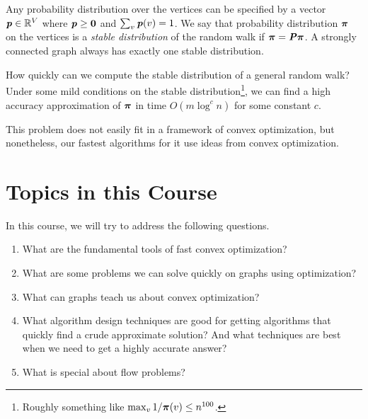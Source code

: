 Any probability distribution over the vertices can be specified by a vector
$\boldsymbol{\mathit{p}} \in \mathbb{R}^V$ where $\boldsymbol{\mathit{p}} \geq
\boldsymbol{0}$ and $\sum_v \boldsymbol{\mathit{p}}(v) = 1$.
We say that probability distribution $\boldsymbol{\pi}$ on the vertices is a \emph{stable distribution} of the random walk
if $\boldsymbol{\pi} = \boldsymbol{\mathit{P}} \boldsymbol{\pi}$.
A strongly connected graph always has exactly one stable distribution.

How quickly can we compute the stable distribution of a general random
walk? Under some mild conditions on the stable
distribution\footnote{Roughly something like $\max_{v} 1/\boldsymbol{\pi}(v) \leq n^{100}$.}, we can find
a high accuracy approximation of $\boldsymbol{\pi}$ in time $O(m \log^cn )$ for
some constant $c$.

This problem does not easily fit in a framework of convex
optimization, but nonetheless, our fastest algorithms for it use ideas
from convex optimization.

\section*{Topics in this Course}
In this course, we will try to address the following questions.
\begin{enumerate}
\item What are the fundamental tools of fast convex optimization?
\item What are some problems we can solve quickly on graphs using optimization?
\item What can graphs teach us about convex optimization?
\item What algorithm design techniques are good for getting algorithms
  that quickly find a crude approximate solution? And what techniques
  are best when we need to get a highly accurate answer?
\item What is special about flow problems?
\end{enumerate}



